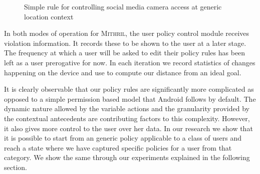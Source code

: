 \begin{figure}[tb]
	\centering
	\noindent{}
	\caption{Simple rule for controlling social media camera access at generic location context}
	\label{ruleWork}
\end{figure}

In both modes of operation for \textsc{Mithril}, the user policy control module receives violation information. It records these to be shown to the user at a later stage. The frequency at which a user will be asked to edit their policy rules has been left as a user prerogative for now. In each iteration we record statistics of changes happening on the device and use to compute our distance from an ideal goal.



It is clearly observable that our policy rules are significantly more complicated as opposed to a simple permission based model that Android follows by default. The dynamic nature allowed by the variable actions and the granularity provided by the contextual antecedents are contributing factors to this complexity. However, it also gives more control to the user over her data. In our research we show that it is possible to start from an generic policy applicable to a class of users and reach a state where we have captured specific policies for a user from that category. We show the same through our experiments explained in the following section.